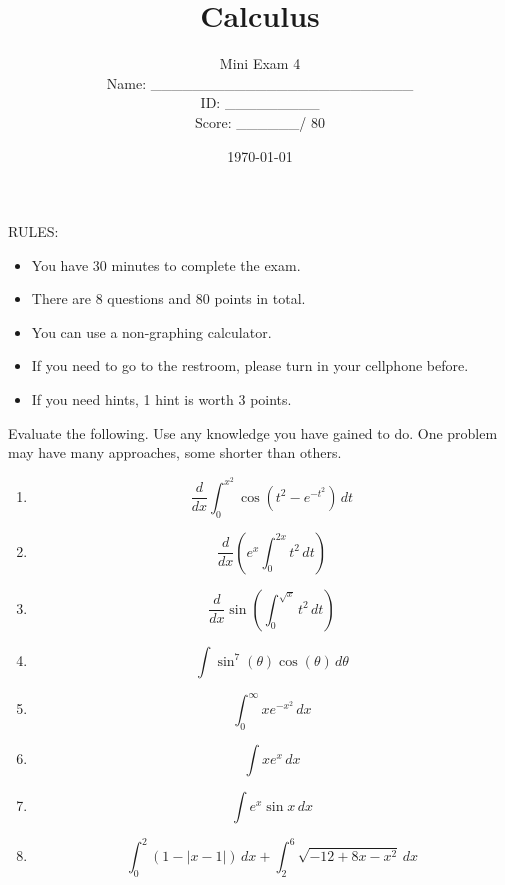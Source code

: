 \documentclass[12pt]{amsart}
\title{ Calculus }
\author{  Mini Exam 4  \\ \vspace{1cm} Name: \_\_\_\_\_\_\_\_\_\_\_\_\_\_\_\_\_\_\_\_\_\_\_\_\_  
\\ \vspace{1cm} ID: \_\_\_\_\_\_\_\_\_ \\ \vspace{1cm} Score: \_\_\_\_\_\_/ 80}
\date{\today}
\begin{document}
\maketitle


RULES:
\begin{itemize}
	\item You have 30 minutes to complete the exam.
	\item There are 8 questions and 80 points in total.
	\item You can use a non-graphing calculator.
	\item If you need to go to the restroom, please turn in your cellphone before.
	\item If you need hints, 1 hint is worth 3 points.
\end{itemize}

\newpage


Evaluate the following. Use any knowledge you have gained to do. One problem may have many approaches, some shorter than others.
\begin{enumerate}
	\item $$\frac{d}{dx} \int_0^{x^2} \cos\left( t^2 - e^{-t^2} \right) \, dt$$
	      \vspace{7cm}
	\item $$ \frac{d}{dx} \left( e^x \int_0^{2x} t^2 \, dt  \right) $$
	      \newpage
	\item $$ \frac{d}{dx}  \sin\left( \int_0^{\sqrt{x}} t^2 \, dt  \right)  $$
	      \vspace{8cm}
	\item $$\int \sin^7 (\theta) \cos (\theta) \, d\theta$$
	      \newpage
	\item $$ \int_0^\infty x e^{-x^2} \, dx $$
	      \vspace{8cm}
	\item $$ \int x e^x \, dx $$
	      \newpage
	\item $$ \int e^x \sin x \, dx $$
	      \vspace{8cm}
	\item $$ \int_0^{2}  \left( 1 - \left| x - 1   \right|  \right)  \, dx + \int_2^6 \sqrt{-12 + 8x -x^2}   \, dx $$
	      \vspace{7cm}
\end{enumerate}
\end{document}
